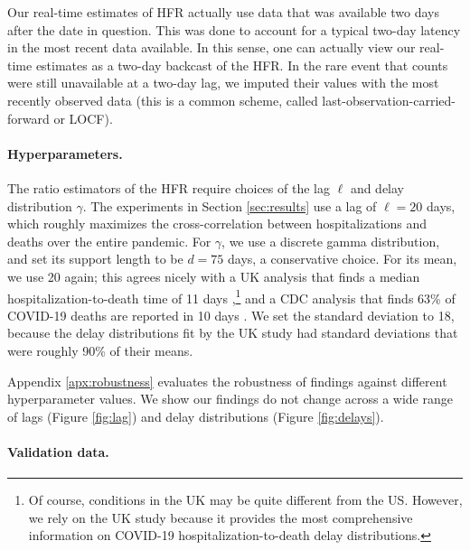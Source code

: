 \documentclass{article}
\begin{document}
Our real-time estimates of HFR actually use data that was available two days
after the date in question. This was done to account for a typical two-day
latency in the most recent data available. In this sense, one can actually view
our real-time estimates as a two-day backcast of the HFR. In the rare event that
counts were still unavailable at a two-day lag, we imputed their values with the
most recently observed data (this is a common scheme, called
last-observation-carried-forward or LOCF).        

\paragraph{Hyperparameters.}

The ratio estimators of the HFR require choices of the lag $\ell$ and delay
distribution $\gamma$. The experiments in Section \ref{sec:results} use a lag of
$\ell=20$ days, which roughly maximizes the cross-correlation between
hospitalizations and deaths over the entire pandemic. For $\gamma$, we use a
discrete gamma distribution, and set its support length to be $d=75$ days, a
conservative choice. For its mean, we use 20 again; this agrees nicely with a UK
analysis that finds a median hospitalization-to-death time of 11 days
\citep{UKdelay},\footnote{Of course, conditions in the UK may be quite different
  from the US. However, we rely on the UK study because it provides the most
  comprehensive information on COVID-19 hospitalization-to-death delay 
  distributions.}   
and a CDC analysis that finds 63\% of COVID-19 deaths are reported in 10 days   
\citep{cdc_deaths_demographic_geographic_2023}. We set the standard deviation to 
18, because the delay distributions fit by the UK study had standard deviations
that were roughly 90\% of their means. 

Appendix \ref{apx:robustness} evaluates
the robustness of findings against different hyperparameter values. 
We show our findings do not change across a wide range of lags (Figure \ref{fig:lag}) and delay distributions (Figure \ref{fig:delays}).

\paragraph{Validation data.}
\end{document}
